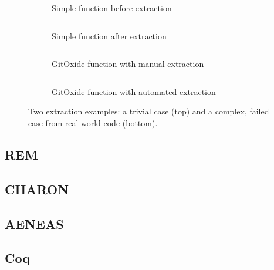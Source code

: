 \begin{figure}[h]
\centering
\begin{subfigure}{0.45\linewidth}
  \inputminted[fontsize=\footnotesize, frame=none, linenos=false, breaklines=true, breakanywhere=true]{rust}{3_Chapter3/simple_original.rs}
  \caption{Simple function before extraction}
\end{subfigure}
\hfill
\begin{subfigure}{0.45\linewidth}
  \inputminted[fontsize=\footnotesize, frame=none, linenos=false, breaklines=true, breakanywhere=true]{rust}{3_Chapter3/simple_extracted.rs}
  \caption{Simple function after extraction}
\end{subfigure}

\vspace{1em}

\begin{subfigure}{0.45\linewidth}
  \inputminted[fontsize=\footnotesize, frame=none, linenos=false, breaklines=true, breakanywhere=true]{rust}{3_Chapter3/complex_original.rs}
  \caption{GitOxide function with manual extraction}
\end{subfigure}
\hfill
\begin{subfigure}{0.45\linewidth}
  \inputminted[fontsize=\footnotesize, frame=none, linenos=false, breaklines=true, breakanywhere=true]{rust}{3_Chapter3/complex_extracted.rs}
  \caption{GitOxide function with automated extraction}
\end{subfigure}

\caption{Two extraction examples: a trivial case (top) and a complex, failed case from real-world code (bottom).}
\label{fig:extraction_examples}
\end{figure}



\subsection{REM}

\subsection{CHARON}

\subsection{AENEAS}

\subsection{Coq}


